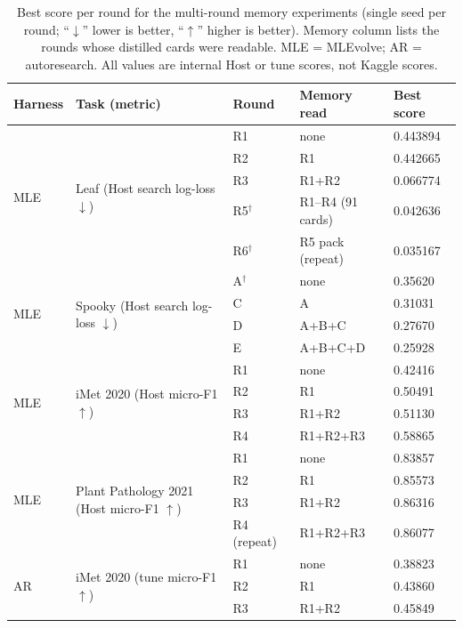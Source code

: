 \begin{table}[t]
  \centering
  \caption{Best score per round for the multi-round memory experiments
  (single seed per round; ``$\downarrow$'' lower is better, ``$\uparrow$''
  higher is better).  Memory column lists the rounds whose distilled cards
  were readable.  MLE = MLEvolve; AR = autoresearch.  All values are internal
  Host or tune scores, not Kaggle scores.}
  \label{tab:multiround-summary}
  \small
  \setlength{\tabcolsep}{4pt}
  \begin{tabular}{@{}lllll@{}}
    \toprule
    Harness & Task (metric) & Round & Memory read & Best score \\
    \midrule
    \multirow{5}{*}{MLE} & \multirow{5}{*}{Leaf (Host search log-loss $\downarrow$)}
      & R1 & none & 0.443894 \\
    & & R2 & R1 & 0.442665 \\
    & & R3 & R1+R2 & 0.066774 \\
    & & R5$^\dagger$ & R1--R4 (91 cards) & 0.042636 \\
    & & R6$^\dagger$ & R5 pack (repeat) & 0.035167 \\
    \midrule
    \multirow{4}{*}{MLE} & \multirow{4}{*}{Spooky (Host search log-loss $\downarrow$)}
      & A$^\dagger$ & none & 0.35620 \\
    & & C & A & 0.31031 \\
    & & D & A+B+C & 0.27670 \\
    & & E & A+B+C+D & 0.25928 \\
    \midrule
    \multirow{4}{*}{MLE} & \multirow{4}{*}{iMet 2020 (Host micro-F1 $\uparrow$)}
      & R1 & none & 0.42416 \\
    & & R2 & R1 & 0.50491 \\
    & & R3 & R1+R2 & 0.51130 \\
    & & R4 & R1+R2+R3 & 0.58865 \\
    \midrule
    \multirow{4}{*}{MLE} & \multirow{4}{*}{Plant Pathology 2021 (Host micro-F1 $\uparrow$)}
      & R1 & none & 0.83857 \\
    & & R2 & R1 & 0.85573 \\
    & & R3 & R1+R2 & 0.86316 \\
    & & R4 (repeat) & R1+R2+R3 & 0.86077 \\
    \midrule
    \multirow{3}{*}{AR} & \multirow{3}{*}{iMet 2020 (tune micro-F1 $\uparrow$)}
      & R1 & none & 0.38823 \\
    & & R2 & R1 & 0.43860 \\
    & & R3 & R1+R2 & 0.45849 \\

\end{tabular}
\end{table}
